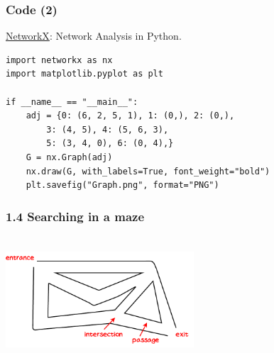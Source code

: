 \documentclass[aspectratio=169, 14pt]{beamer}
\begin{document}
\begin{frame}[fragile]
	\frametitle{Code (2)}
	\href{https://networkx.org/}{NetworkX}: Network Analysis in Python.

	\begin{verbatim}
import networkx as nx
import matplotlib.pyplot as plt

if __name__ == "__main__":
    adj = {0: (6, 2, 5, 1), 1: (0,), 2: (0,), 
        3: (4, 5), 4: (5, 6, 3),
        5: (3, 4, 0), 6: (0, 4),}
    G = nx.Graph(adj)
    nx.draw(G, with_labels=True, font_weight="bold")
    plt.savefig("Graph.png", format="PNG")
\end{verbatim}
\end{frame}


\begin{frame}[fragile]
	\frametitle{1.4 Searching in a maze}

	\begin{columns}
		\includegraphics[width=7cm, height=4cm]{week12/maze.pdf}


	\end{columns}
\end{frame}
\end{document}
